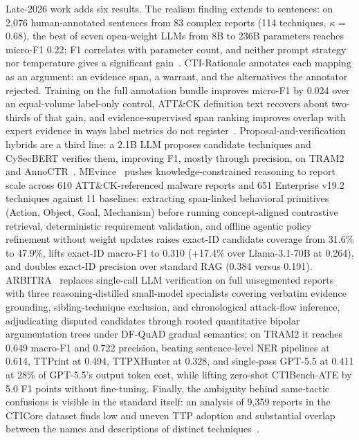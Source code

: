 \documentclass[11pt]{article}
\begin{document}
Late-2026 work adds six results.
The realism finding extends to sentences: on 2,076 human-annotated sentences from 83 complex reports (114 techniques, $\kappa$ = 0.68), the best of seven open-weight LLMs from 8B to 236B parameters reaches micro-F1 0.22; F1 correlates with parameter count, and neither prompt strategy nor temperature gives a significant gain~\citep{ryan2026evaluating}. CTI-Rationale annotates each mapping as an argument: an evidence span, a warrant, and the alternatives the annotator rejected. Training on the full annotation bundle improves micro-F1 by 0.024 over an equal-volume label-only control, ATT\&CK definition text recovers about two-thirds of that gain, and evidence-supervised span ranking improves overlap with expert evidence in ways label metrics do not register~\citep{resul2026ctirationale}. Proposal-and-verification hybrids are a third line: a 2.1B LLM proposes candidate techniques and CySecBERT verifies them, improving F1, mostly through precision, on TRAM2 and AnnoCTR~\citep{kim2026hybrid}. MEvince~\citep{she2026mevince} pushes knowledge-constrained reasoning to report scale across 610 ATT\&CK-referenced malware reports and 651 Enterprise v19.2 techniques against 11 baselines: extracting span-linked behavioral primitives (Action, Object, Goal, Mechanism) before running concept-aligned contrastive retrieval, deterministic requirement validation, and offline agentic policy refinement without weight updates raises exact-ID candidate coverage from 31.6\% to 47.9\%, lifts exact-ID macro-F1 to 0.310 (+17.4\% over Llama-3.1-70B at 0.264), and doubles exact-ID precision over standard RAG (0.384 versus 0.191).
ARBITRA~\citep{jin2026arbitra} replaces single-call LLM verification on full unsegmented reports with three reasoning-distilled small-model specialists covering verbatim evidence grounding, sibling-technique exclusion, and chronological attack-flow inference, adjudicating disputed candidates through rooted quantitative bipolar argumentation trees under DF-QuAD gradual semantics; on TRAM2 it reaches 0.649 macro-F1 and 0.722 precision, beating sentence-level NER pipelines at 0.614, TTPrint at 0.494, TTPXHunter at 0.328, and single-pass GPT-5.5 at 0.411 at 28\% of GPT-5.5's output token cost, while lifting zero-shot CTIBench-ATE by 5.0 F1 points without fine-tuning.
Finally, the ambiguity behind same-tactic confusions is visible in the standard itself: an analysis of 9,359 reports in the CTICore dataset finds low and uneven TTP adoption and substantial overlap between the names and descriptions of distinct techniques~\citep{suarezroman2026ttp}.
\end{document}
